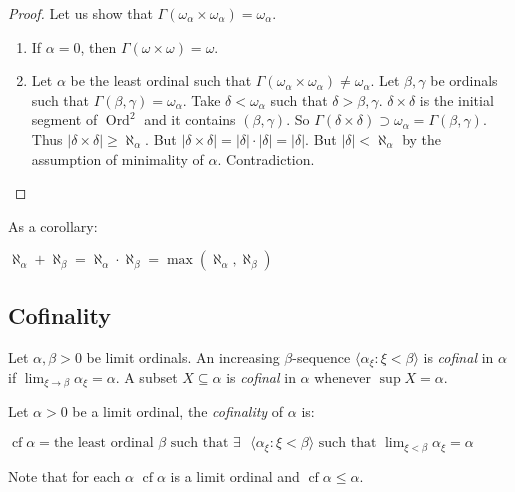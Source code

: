\documentclass[8pt]{article}
\theoremstyle{definition}
\theoremstyle{definition}
\theoremstyle{definition}
\theoremstyle{definition}
\theoremstyle{definition}
\theoremstyle{definition}
\theoremstyle{definition}
\theoremstyle{definition}
\theoremstyle{definition}
\theoremstyle{definition}
\theoremstyle{definition}
\theoremstyle{definition}
\theoremstyle{col}
\theoremstyle{question}
\begin{document}
\begin{proof}
  Let us show that $\Gamma(\omega_{\alpha} \times \omega_{\alpha}) = \omega_{\alpha}$. 
  \begin{enumerate}
    \item If $\alpha = 0$, then $\Gamma(\omega \times \omega) = \omega$.
    \item Let $\alpha$ be the least ordinal such that $\Gamma(\omega_{\alpha} \times \omega_{\alpha}) \neq \omega_{\alpha}$.
    Let $\beta, \gamma$ be ordinals such that $\Gamma(\beta, \gamma) = \omega_{\alpha}$.
    Take $\delta < \omega_{\alpha}$ such that $\delta > \beta, \gamma$. 
    $\delta \times \delta$ is the initial segment of $\operatorname{Ord}^2$ and it contains $(\beta, \gamma)$. 
    So $\Gamma(\delta \times \delta) \supset \omega_{\alpha} = \Gamma(\beta, \gamma)$.
    Thus $|\delta \times \delta| \geq \aleph_{\alpha}$. 
    But $|\delta \times \delta| = |\delta| \cdot |\delta| = |\delta|$. But $|\delta| < \aleph_{\alpha}$ by the assumption 
    of minimality of $\alpha$. Contradiction.
  \end{enumerate}
\end{proof}

As a corollary:
\begin{center}
  $\aleph_{\alpha} + \aleph_{\beta} = \aleph_{\alpha} \cdot \aleph_{\beta} = \max(\aleph_{\alpha}, \aleph_{\beta})$
\end{center}

\subsection{Cofinality}

Let $\alpha, \beta > 0$ be limit ordinals. An increasing $\beta$-sequence 
$\langle \alpha_{\xi} : \xi < \beta \rangle$ is \emph{cofinal} in $\alpha$ if $\lim_{\xi \to \beta} \alpha_{\xi} = \alpha$.
A subset $X \subseteq \alpha$ is \emph{cofinal} in $\alpha$ whenever $\sup X = \alpha$.

Let $\alpha > 0$ be a limit ordinal, the \emph{cofinality} of $\alpha$ is:
\begin{center}
  $\operatorname{cf} \alpha = \text{the least ordinal $\beta$ such that $\exists$ 
  $\langle \alpha_{\xi} : \xi < \beta \rangle$ such that $\lim_{\xi < \beta} \alpha_{\xi} = \alpha$}$
\end{center}

  Note that for each $\alpha$ $\operatorname{cf} \alpha$ is a limit ordinal and $\operatorname{cf} \alpha \leq \alpha$.
\end{document}
